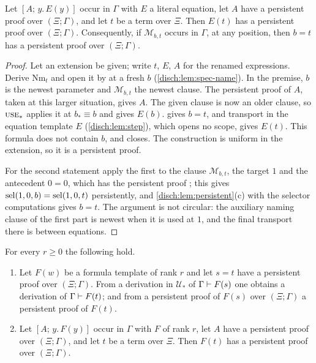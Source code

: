 \begin{lemma}
\label{disch:lem:spec-atomic}
Let $[A;\,y.\,E(y)]$ occur in $\Gamma$ with $E$ a literal equation, let
$A$ have a persistent proof over $(\Xi;\Gamma)$, and let $t$ be a term
over $\Xi$. Then $E(t)$ has a persistent proof over $(\Xi;\Gamma)$.
Consequently, if $\mathcal M_{b,t}$ occurs in $\Gamma$, at any position,
then $b=t$ has a persistent proof over $(\Xi;\Gamma)$.
\end{lemma}

\begin{proof}
Let an extension be given; write $t$, $E$, $A$ for the renamed
expressions. Derive $\mathrm{Nm}_t$ and open it by  at a
fresh $b$ (\cref{disch:lem:spec-name}). In the premise, $b$ is the newest
parameter and $\mathcal M_{b,t}$ the newest clause. The persistent proof
of $A$, taken at this larger situation, gives $A$. The given clause is now
an older clause, so $\rulename{Use}_*$ applies it at $b_*\equiv b$ and
gives $E(b)$.  gives $b=t$, and transport in the
equation template $E$ (\cref{disch:lem:step}), which opens no scope, gives
$E(t)$. This formula does not contain $b$, and  closes. The
construction is uniform in the extension, so it is a persistent proof.

For the second statement apply the first to the clause
$\mathcal M_{b,t}$, the target $1$ and the antecedent $0=0$, which has the
persistent proof ; this gives
$\operatorname{sel}(1,0,b)=\operatorname{sel}(1,0,t)$ persistently, and
\cref{disch:lem:persistent}(c) with the selector computations gives $b=t$.
The argument is not circular: the auxiliary naming clause of the first
part is newest when it is used at $1$, and the final transport there is
between equations.
\end{proof}

\begin{lemma}
\label{disch:lem:spec-rank}
For every $r\geq 0$ the following hold.
\begin{enumerate}[label=\textup{(\alph*)}]
\item[$(\mathrm T_r)$] Let $F(w)$ be a formula template of rank $r$ and
 let $s=t$ have a persistent proof over $(\Xi;\Gamma)$. From a derivation
 in $\mathcal U_*$ of $\Gamma\vdash F(s)$ one obtains a derivation of
 $\Gamma\vdash F(t)$; and from a persistent proof of $F(s)$ over
 $(\Xi;\Gamma)$ a persistent proof of $F(t)$.
\item[$(\mathrm S_r)$] Let $[A;\,y.\,F(y)]$ occur in $\Gamma$ with $F$ of
 rank $r$, let $A$ have a persistent proof over $(\Xi;\Gamma)$, and let
 $t$ be a term over $\Xi$. Then $F(t)$ has a persistent proof over
 $(\Xi;\Gamma)$.
\end{enumerate}
\end{lemma}

